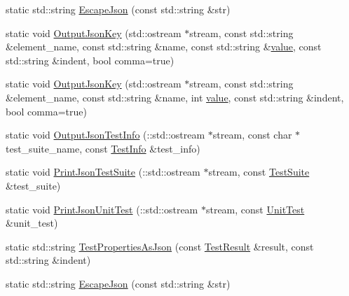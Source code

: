 \begin{DoxyCompactItemize}
\item 
static std\+::string \mbox{\hyperlink{classtesting_1_1internal_1_1_json_unit_test_result_printer_aa1a3293d98ef12aec185983ee10bdfd8}{Escape\+Json}} (const std\+::string \&str)
\item 
static void \mbox{\hyperlink{classtesting_1_1internal_1_1_json_unit_test_result_printer_a78cedc9b8afd033a90cd921f65a0f4c5}{Output\+Json\+Key}} (std\+::ostream $\ast$stream, const std\+::string \&element\+\_\+name, const std\+::string \&name, const std\+::string \&\mbox{\hyperlink{_obj__test_2lib_2googletest-master_2googlemock_2test_2gmock-matchers__test_8cc_a337b8a670efc0b086ad3af163f3121b6}{value}}, const std\+::string \&indent, bool comma=true)
\item 
static void \mbox{\hyperlink{classtesting_1_1internal_1_1_json_unit_test_result_printer_af7bacb58770f91639ac729c9b26e3f18}{Output\+Json\+Key}} (std\+::ostream $\ast$stream, const std\+::string \&element\+\_\+name, const std\+::string \&name, int \mbox{\hyperlink{_obj__test_2lib_2googletest-master_2googlemock_2test_2gmock-matchers__test_8cc_a337b8a670efc0b086ad3af163f3121b6}{value}}, const std\+::string \&indent, bool comma=true)
\item 
static void \mbox{\hyperlink{classtesting_1_1internal_1_1_json_unit_test_result_printer_ab39c154832ac88772aca11e6d7c40777}{Output\+Json\+Test\+Info}} (\+::std\+::ostream $\ast$stream, const char $\ast$test\+\_\+suite\+\_\+name, const \mbox{\hyperlink{classtesting_1_1_test_info}{Test\+Info}} \&test\+\_\+info)
\item 
static void \mbox{\hyperlink{classtesting_1_1internal_1_1_json_unit_test_result_printer_a793db9fbffa145600e4bca3151bfd2c0}{Print\+Json\+Test\+Suite}} (\+::std\+::ostream $\ast$stream, const \mbox{\hyperlink{classtesting_1_1_test_suite}{Test\+Suite}} \&test\+\_\+suite)
\item 
static void \mbox{\hyperlink{classtesting_1_1internal_1_1_json_unit_test_result_printer_a8f4b1ac86fde9a895d2b26c1b013dd38}{Print\+Json\+Unit\+Test}} (\+::std\+::ostream $\ast$stream, const \mbox{\hyperlink{classtesting_1_1_unit_test}{Unit\+Test}} \&unit\+\_\+test)
\item 
static std\+::string \mbox{\hyperlink{classtesting_1_1internal_1_1_json_unit_test_result_printer_a4f98df9d853fce2981626d8adbf21a77}{Test\+Properties\+As\+Json}} (const \mbox{\hyperlink{classtesting_1_1_test_result}{Test\+Result}} \&result, const std\+::string \&indent)
\item 
static std\+::string \mbox{\hyperlink{classtesting_1_1internal_1_1_json_unit_test_result_printer_aa1a3293d98ef12aec185983ee10bdfd8}{Escape\+Json}} (const std\+::string \&str)

\end{DoxyCompactItemize}
